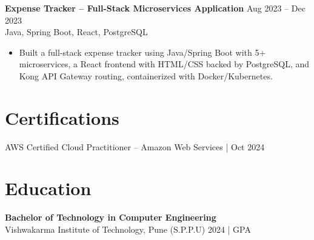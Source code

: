 \documentclass[10pt,letterpaper]{article}
\newcommand{\resumeSubheading}[4]{%
  \textbf{#1} \hfill #2 \\
  #3 \hfill #4 \\
}
\begin{document}
\resumeSubheading{Expense Tracker -- Full-Stack Microservices Application}{Aug 2023 -- Dec 2023}{}{Java, Spring Boot, React, PostgreSQL}
\begin{itemize}
    \item Built a full-stack expense tracker using Java/Spring Boot with 5+ microservices, a React frontend with HTML/CSS backed by PostgreSQL, and Kong API Gateway routing, containerized with Docker/Kubernetes.
\end{itemize}

\section*{Certifications}
AWS Certified Cloud Practitioner -- Amazon Web Services \enspace | \enspace Oct 2024

\section*{Education}
\resumeSubheading{Bachelor of Technology in Computer Engineering}{}{Vishwakarma Institute of Technology, Pune (S.P.P.U)}{2024 \enspace | \enspace 8.8 GPA}
\end{document}
